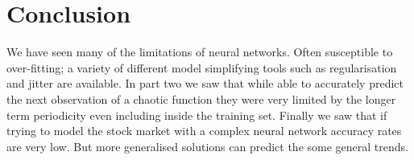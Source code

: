 \documentclass[a4paper,10pt, twocolumn]{article}
\begin{document}
\section{Conclusion}
We have seen many of the limitations of neural networks. Often susceptible to over-fitting; a variety of different model simplifying tools such as regularisation and jitter are available. In part two we saw that while able to accurately predict the next observation of a chaotic function they were very limited by the longer term periodicity even including inside the training set. Finally we saw that if trying to model the stock market with a complex neural network accuracy rates are very low. But more generalised solutions can predict the some general trends. 
\end{document}
